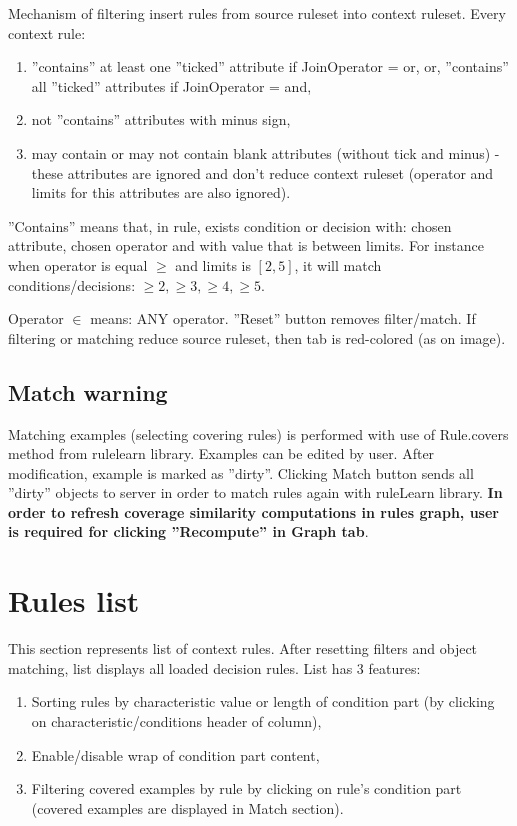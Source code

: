 \documentclass[12pt]{article}
\begin{document}
Mechanism of filtering insert rules from source ruleset into context ruleset. Every context rule:
\begin{enumerate}
    \setlength\itemsep{0em}
    \item ''contains'' at least one ''ticked'' attribute if JoinOperator = or, or, ''contains'' all ''ticked'' attributes if JoinOperator = and,
    \item not ''contains'' attributes with minus sign,
    \item may contain or may not contain blank attributes (without tick and minus) - these attributes are ignored and don't reduce context ruleset (operator and limits for this attributes are also ignored).
\end{enumerate}
''Contains'' means that, in rule, exists condition or decision with: chosen attribute, chosen operator and with value that is between limits. For instance when operator is equal $\ge$ and limits is $[2,5]$, it will match conditions/decisions: $\ge 2, \ge 3, \ge 4, \ge 5$. 

Operator $\in$ means: ANY operator. ''Reset'' button removes filter/match. If filtering or matching reduce source ruleset, then tab is red-colored (as on image).

\subsection{Match warning}\label{match}
Matching examples (selecting covering rules) is performed with use of Rule.covers method from rulelearn library. Examples can be edited by user. After modification, example is marked as ''dirty''. Clicking Match button sends all ''dirty'' objects to server in order to match rules again with ruleLearn library. \textbf{In order to refresh coverage similarity computations in rules graph, user is required for clicking ''Recompute'' in Graph tab}.

\section{Rules list}

This section represents list of context rules. After resetting filters and object matching, list displays all loaded decision rules. List has 3 features:
\begin{enumerate}
    \setlength\itemsep{0em}
    \item Sorting rules by characteristic value or length of condition part (by clicking on characteristic/conditions header of column),
    \item Enable/disable wrap of condition part content,
    \item Filtering covered examples by rule by clicking on rule's condition part (covered examples are displayed in Match section).
\end{enumerate}
\end{document}
